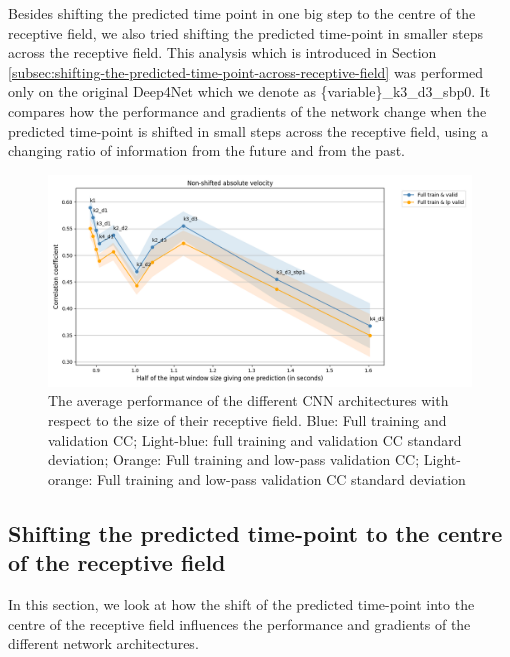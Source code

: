Besides shifting the predicted time point in one big step to the centre of the receptive field, we also tried shifting the predicted time-point in smaller steps across the receptive field.
This analysis which is introduced in Section \ref{subsec:shifting-the-predicted-time-point-across-receptive-field} was performed only on the original Deep4Net which we denote as \{variable\}\_k3\_d3\_sbp0.
It compares how the performance and gradients of the network change when the predicted time-point is shifted in small steps across the receptive field, using a changing ratio of information from the future and from the past.

\begin{figure}[!htbp]
\centering
   \includegraphics[width=1\linewidth]{img/ch4/distance-shifted-performance-absVel}
   \caption[Dependence of performance on receptive field size]{The average performance of the different CNN architectures with respect to the size of their receptive field. Blue: Full training and validation CC; Light-blue: full training and validation CC standard deviation; Orange: Full training and low-pass validation CC; Light-orange: Full training and low-pass validation CC standard deviation}
   \label{fig:figure-distance}
\end{figure}

\subsection{Shifting the predicted time-point to the centre of the receptive field}\label{subsec:shifting-the-predicted-time-point-to-the-centre-of-the-receptive-field}
In this section, we look at how the shift of the predicted time-point into the centre of the receptive field influences the performance and gradients of the different network architectures.

